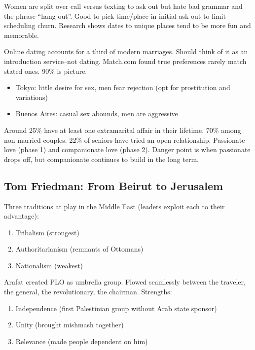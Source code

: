 \documentclass[
]{article}
\begin{document}
Women are split over call versus texting to ask out but hate bad grammar
and the phrase ``hang out''. Good to pick time/place in initial ask out
to limit scheduling churn. Research shows dates to unique places tend to
be more fun and memorable.

Online dating accounts for a third of modern marriages. Should think of
it as an introduction service--not dating. Match.com found true
preferences rarely match stated ones. 90\% is picture.

\begin{itemize}
\item
  Tokyo: little desire for sex, men fear rejection (opt for prostitution
  and variations)
\item
  Buenos Aires: casual sex abounds, men are aggressive
\end{itemize}

Around 25\% have at least one extramarital affair in their lifetime.
70\% among non married couples. 22\% of seniors have tried an open
relationship. Passionate love (phase 1) and companionate love (phase 2).
Danger point is when passionate drops off, but companionate continues to
build in the long term.

\hypertarget{tom-friedman-from-beirut-to-jerusalem}{%
\subsection{Tom Friedman: From Beirut to
Jerusalem}\label{tom-friedman-from-beirut-to-jerusalem}}

Three traditions at play in the Middle East (leaders exploit each to
their advantage):

\begin{enumerate}
\def\labelenumi{\arabic{enumi}.}
\item
  Tribalism (strongest)
\item
  Authoritarianism (remnants of Ottomans)
\item
  Nationalism (weakest)
\end{enumerate}

Arafat created PLO as umbrella group. Flowed seamlessly between the
traveler, the general, the revolutionary, the chairman. Strengths:

\begin{enumerate}
\def\labelenumi{\arabic{enumi}.}
\item
  Independence (first Palestinian group without Arab state sponsor)
\item
  Unity (brought mishmash together)
\item
  Relevance (made people dependent on him)
\end{enumerate}
\end{document}
